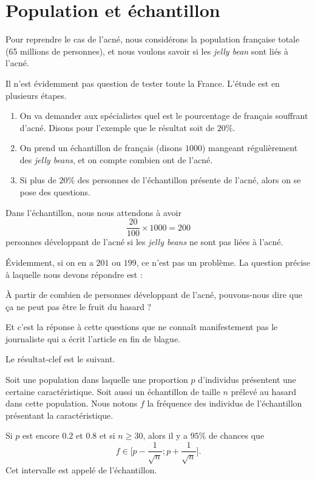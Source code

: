 \section{Population et échantillon}

Pour reprendre le cas de l'acné, nous considérons la population française totale (65 millions de personnes), et nous voulons savoir si les \emph{jelly bean} sont liés à l'acné.

Il n'est évidemment pas question de tester toute la France. L'étude est en plusieurs étapes.
\begin{enumerate}
    \item
        On va demander aux spécialistes quel est le pourcentage de français souffrant d'acné. Disons pour l'exemple que le résultat soit de \( 20\%\).
    \item
        On prend un échantillon de français (disons \( 1000\)) mangeant régulièrement des \emph{jelly beans}, et on compte combien ont de l'acné.
    \item
        Si plus de \( 20\%\) des personnes de l'échantillon présente de l'acné, alors on se pose des questions.
\end{enumerate}

Dans l'échantillon, nous nous attendons à avoir 
\begin{equation}
    \frac{ 20 }{ 100 }\times 1000=200
\end{equation}
personnes développant de l'acné si les \emph{jelly beans} ne sont pas liées à l'acné. 

Évidemment, si on en a \( 201\) ou \( 199\), ce n'est pas un problème. La question précise à laquelle nous devons répondre est :
\begin{Aretenir}
    À partir de combien de personnes développant de l'acné, pouvons-nous dire que ça ne peut pas être le fruit du hasard ?
\end{Aretenir}
Et c'est la réponse à cette questions que ne connaît manifestement pas le journaliste qui a écrit l'article en fin de blague.

Le résultat-clef est le suivant.
\begin{Aretenir}
    Soit une population dans laquelle une proportion \( p\) d'individus présentent une certaine caractéristique. Soit aussi un échantillon de taille \( n\) prélevé au hasard dans cette population. Nous notons \( f\) la fréquence des individus de l'échantillon présentant la caractéristique. 

    Si \( p\) est encore \( 0.2\) et \( 0.8\) et si \( n\geq 30\), alors il y a \( 95\%\) de chances que 
    \begin{equation}
        f\in\mathopen[ p-\frac{1}{ \sqrt{n} } ; p+\frac{1}{ \sqrt{n} } \mathclose].
    \end{equation}
    Cet intervalle est appelé  de l'échantillon.
\end{Aretenir}


